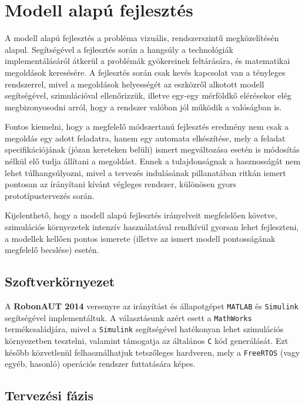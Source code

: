 \section{Modell alapú fejlesztés}

A modell alapú fejlesztés a probléma vizuális, rendszerszintű megközelítésén alapul. Segítségével a fejlesztés során a hangsúly a technológiák implementálásáról átkerül a problémák gyökereinek feltárására, és matematikai megoldások keresésére. A fejlesztés során csak kevés kapcsolat van a tényleges rendszerrel, mivel a megoldások helyességét az eszközről alkotott modell segítségével, szimulációval ellenőrizzük, illetve egy-egy mérföldkő elérésekor elég megbizonyosodni arról, hogy a rendszer valóban jól működik a valóságban is.

Fontos kiemelni, hogy a megfelelő módszertanú fejlesztés eredmény nem csak a megoldás egy adott feladatra, hanem egy automata elkészítése, mely a feladat specifikációjának (józan kereteken belüli) ismert megváltozása esetén is módosítás nélkül elő tudja állítani a megoldást. Ennek a tulajdonságnak a hasznosságát nem lehet túlhangsúlyozni, mivel a tervezés indulásának pillanatában ritkán ismert pontosan az írányítani kívánt végleges rendszer, különösen gyors prototípustervezés során.

Kijelenthető, hogy a modell alapú fejlesztés irányelveit megfelelően követve, szimulációs környezetek intenzív használatával rendkívül gyorsan lehet fejleszteni, a modellek kellően pontos ismerete (illetve az ismert modell pontosságának megfelelő becslése) esetén.

\subsection{Szoftverkörnyezet} 

A \textbf{RobonAUT 2014} versenyre az irányítást és állapotgépet \verb!MATLAB! és \verb!Simulink! segítségével implementáltuk. A választásunk azért esett a \verb!MathWorks! termékcsaládjára, mivel a \verb!Simulink! segítségével hatékonyan lehet szimulációs környezetben tesztelni, valamint támogatja az általános \verb!C! kód generálását. Ezt később közvetlenül felhasználhatjuk tetszőleges hardveren, mely a \verb!FreeRTOS! (vagy egyéb, hasonló) operációs rendszer futtatására képes.

\subsection{Tervezési fázis}

